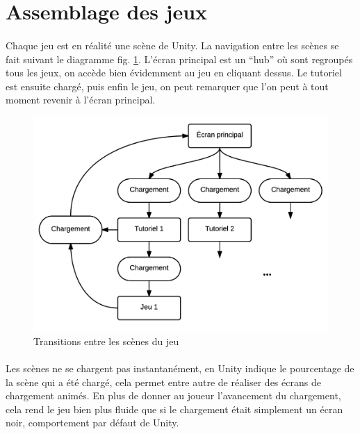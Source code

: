 \section{Assemblage des jeux}
\paragraph{}
Chaque jeu est en réalité une scène de Unity. La navigation entre les scènes se fait suivant le diagramme fig. \ref{transitions_scenes}. L'écran principal est un ``hub'' où sont regroupés tous les jeux, on accède bien évidemment au jeu en cliquant dessus. Le tutoriel est ensuite chargé, puis enfin le jeu, on peut remarquer que l'on peut à tout moment revenir à l'écran principal.

\begin{figure}[H]\centering
  \includegraphics[scale=0.7]{./img/scenes-transitions.png}
  \caption{Transitions entre les scènes du jeu}
  \label{transitions_scenes}
\end{figure}

\paragraph{}
Les scènes ne se chargent pas instantanément, en Unity indique le pourcentage de la scène qui a été chargé, cela permet entre autre de réaliser des écrans de chargement animés. En plus de donner au joueur l'avancement du chargement, cela rend le jeu bien plus fluide que si le chargement était simplement un écran noir, comportement par défaut de Unity.

